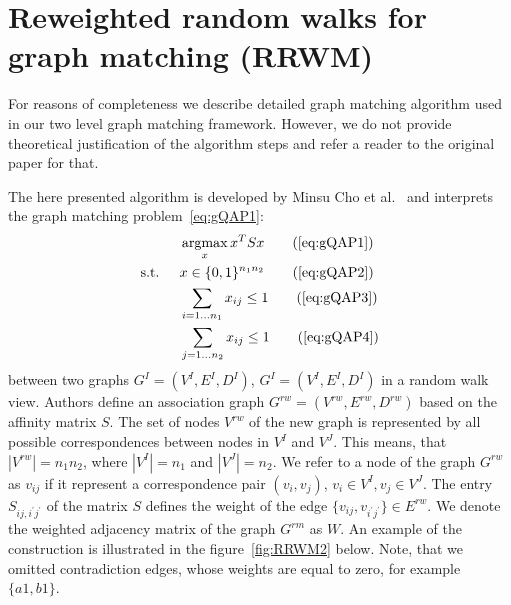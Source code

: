 \chapter{Reweighted random walks for graph matching (RRWM)}\label{appendixB} 
For reasons of completeness we describe detailed graph matching algorithm used in our two level graph matching framework. However, we do not provide theoretical justification of the algorithm steps and refer a reader to the original paper for that. %

The here presented algorithm is developed by Minsu Cho et al.~\cite{Cho2010_RRWM} and interprets the graph matching problem~\eqref{eq:gQAP1}:
\begin{alignat*}{2}
&     && \argmax_x{x^TSx}                           \tag{\ref{eq:gQAP1}}\\
& \text{s.t. } &&  x\in \{0,1\}^{n_1n_2}            \tag{\ref{eq:gQAP2}}\\
&             &&  \sum_{i=1\dots n_1} x_{ij}\le 1   \tag{\ref{eq:gQAP3}}\\
&             &&  \sum_{j=1\dots n_2} x_{ij}\le 1   \tag{\ref{eq:gQAP4}}
\end{alignat*}
between two graphs $G^I=(V^I,E^I,D^I)$, $G^I=(V^I,E^I,D^I)$ in a random walk view. Authors define an association graph $G^{rw}=(V^{rw},E^{rw},D^{rw})$ based on the affinity matrix $S$. The set of nodes $V^{rw}$ of the new graph is represented by all possible correspondences between nodes in $V^I$ and $V^J$. This means, that $|V^{rw}|=n_1n_2$, where $|V^I|=n_1$ and $|V^J|=n_2$. We refer to a node of the graph $G^{rw}$ as $v_{ij}$ if it represent a correspondence pair $(v_i,v_j)$, $v_i\in V^I,v_j\in V^J$. The entry $S_{ij,i^\prime j^\prime}$ of the matrix $S$ defines the weight of the edge $\{v_{ij},v_{i^\prime j^\prime}\}\in E^{rw}$. We denote the weighted adjacency matrix of the graph $G^{rm}$ as $W$. An example of the construction is illustrated in the figure~\ref{fig:RRWM2} below. Note, that we omitted contradiction edges, whose weights are equal to zero, for example $\{a1,b1\}$.

